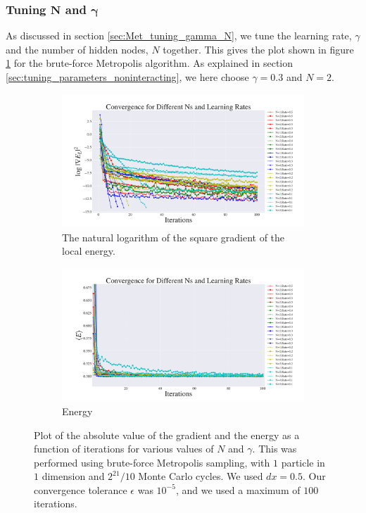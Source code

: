 \documentclass[a4paper, 10pt]{article}
\begin{document}
\subsubsection{Tuning $\boldsymbol{N}$ and $\boldsymbol{\gamma}$}
As discussed in section \ref{sec:Met_tuning_gamma_N}, we tune the learning rate, $\gamma$ and the number of hidden nodes, $N$ together. This gives the plot shown in figure \ref{fig:step_size_and_N_standard} for the brute-force Metropolis algorithm. As explained in section \ref{sec:tuning_parameters_noninteracting}, we here choose $\gamma=0.3$ and $N=2$.\\
\begin{figure}[h!]
\centering
	\begin{subfigure}{.9\textwidth}
		\centering
		\includegraphics[width=\textwidth]{../Results/grad_normal.pdf}
		\caption{The natural logarithm of the square gradient of the local energy.}
	\end{subfigure}%
	
	\begin{subfigure}{.9\textwidth}
		\centering
		\includegraphics[width=\textwidth]{../Results/energy_normal.pdf}
		\caption{Energy}
	\end{subfigure}%
\caption{Plot of the absolute value of the gradient and the energy as a function of iterations for various values of $N$ and $\gamma$. This was performed using brute-force Metropolis sampling, with $1$ particle in $1$ dimension and $2^{21}/10$ Monte Carlo cycles. We used $dx=0.5$. Our convergence tolerance $\epsilon$ was $10^{-5}$, and we used a maximum of $100$ iterations.}\label{fig:step_size_and_N_standard}
\end{figure}
\end{document}

